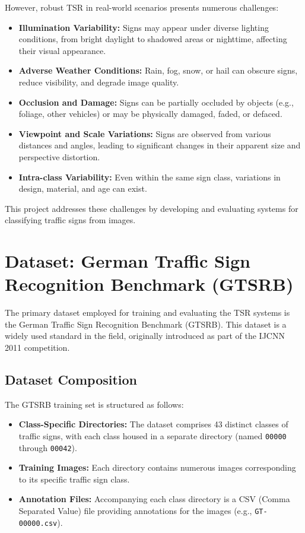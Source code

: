 \documentclass[11pt, a4paper]{article}
\begin{document}
However, robust TSR in real-world scenarios presents numerous challenges:
\begin{itemize}
    \item \textbf{Illumination Variability:} Signs may appear under diverse lighting conditions, from bright daylight to shadowed areas or nighttime, affecting their visual appearance.
    \item \textbf{Adverse Weather Conditions:} Rain, fog, snow, or hail can obscure signs, reduce visibility, and degrade image quality.
    \item \textbf{Occlusion and Damage:} Signs can be partially occluded by objects (e.g., foliage, other vehicles) or may be physically damaged, faded, or defaced.
    \item \textbf{Viewpoint and Scale Variations:} Signs are observed from various distances and angles, leading to significant changes in their apparent size and perspective distortion.
    \item \textbf{Intra-class Variability:} Even within the same sign class, variations in design, material, and age can exist.
\end{itemize}
This project addresses these challenges by developing and evaluating systems for classifying traffic signs from images.

\section{Dataset: German Traffic Sign Recognition Benchmark (GTSRB)}

The primary dataset employed for training and evaluating the TSR systems is the German Traffic Sign Recognition Benchmark (GTSRB). This dataset is a widely used standard in the field, originally introduced as part of the IJCNN 2011 competition.

\subsection{Dataset Composition}
The GTSRB training set is structured as follows:
\begin{itemize}
    \item \textbf{Class-Specific Directories:} The dataset comprises 43 distinct classes of traffic signs, with each class housed in a separate directory (named \texttt{00000} through \texttt{00042}).
    \item \textbf{Training Images:} Each directory contains numerous images corresponding to its specific traffic sign class.
    \item \textbf{Annotation Files:} Accompanying each class directory is a CSV (Comma Separated Value) file providing annotations for the images (e.g., \texttt{GT-00000.csv}).
\end{itemize}
\end{document}
